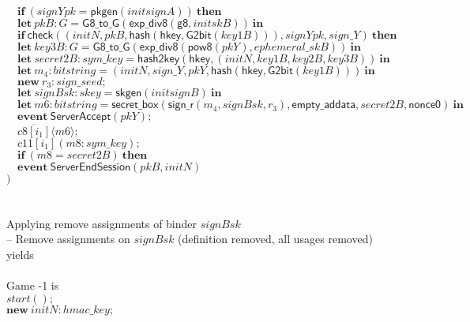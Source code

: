 \documentclass{article}
\newcommand{\cinput}[2]{{#1}({#2})}
\newcommand{\coutput}[2]{\overline{#1}\langle{#2}\rangle}
\newcommand{\kw}[1]{\mathbf{#1}}
\newcommand{\kwf}[1]{\mathsf{#1}}
\newcommand{\var}[1]{\mathit{#1}}
\newcommand{\kwt}[1]{\mathit{#1}}
\newcommand{\kwc}[1]{\mathit{#1}}
\begin{document}
\begin{tabbing}
\>$\quad \kw{if}\ (\var{signYpk}  =  \kwf{pkgen}(\var{initsignA}))\ \kw{then}$\\
\>$\quad \kw{let}\ \var{pkB}: \kwt{G} = \kwf{G8{\_}to{\_}G}(\kwf{exp{\_}div8}(\kwf{g8}, \var{initskB}))\ \kw{in}$\\
\>$\quad \kw{if}\ \kwf{check}(\kwf{}(\var{initN}, \var{pkB}, \kwf{hash}(\kwf{hkey}, \kwf{G2bit}(\var{key1B}))), \var{signYpk}, \var{sign{\_}Y})\ \kw{then}$\\
\>$\quad \kw{let}\ \var{key3B}: \kwt{G} = \kwf{G8{\_}to{\_}G}(\kwf{exp{\_}div8}(\kwf{pow8}(\var{pkY}), \var{ephemeral{\_}skB}))\ \kw{in}$\\
\>$\quad \kw{let}\ \var{secret2B}: \kwt{sym{\_}key} = \kwf{hash2key}(\kwf{hkey}, \kwf{}(\var{initN}, \var{key1B}, \var{key2B}, \var{key3B}))\ \kw{in}$\\
\>$\quad \kw{let}\ \var{m}_{4}: \kwt{bitstring} = \kwf{}(\var{initN}, \var{sign{\_}Y}, \var{pkY}, \kwf{hash}(\kwf{hkey}, \kwf{G2bit}(\var{key1B})))\ \kw{in}$\\
\>$\quad \kw{new}\ \var{r}_{3}: \kwt{sign{\_}seed};$\\
\>$\quad \kw{let}\ \var{signBsk}: \kwt{skey} = \kwf{skgen}(\var{initsignB})\ \kw{in}$\\
\>$\quad \kw{let}\ \var{m6}: \kwt{bitstring} = \kwf{secret{\_}box}(\kwf{sign{\_}r}(\var{m}_{4}, \var{signBsk}, \var{r}_{3}), \kwf{empty{\_}addata}, \var{secret2B}, \kwf{nonce0})\ \kw{in}$\\
\>$\quad \kw{event}\ \kwf{ServerAccept}(\var{pkY});$\\
\>$\quad \coutput{\kwc{c8}[\var{i}_{1}]}{\var{m6}};$\\
\>$\quad \cinput{\kwc{c11}[\var{i}_{1}]}{\var{m8}: \kwt{sym{\_}key}};$\\
\>$\quad \kw{if}\ (\var{m8}  =  \var{secret2B})\ \kw{then}$\\
\>$\quad \kw{event}\ \kwf{ServerEndSession}(\var{pkB}, \var{initN})$\\
\>$)$\\
\\
\\
Applying remove assignments of binder $\var{signBsk}$\\
\quad -- Remove assignments on $\var{signBsk}$ (definition removed, all usages removed)\\
yields\\
\\
Game -1 is\\
\>$\cinput{\kwc{start}}{};$\\
\>$\kw{new}\ \var{initN}: \kwt{hmac{\_}key};$\\

\end{tabbing}
\end{document}
